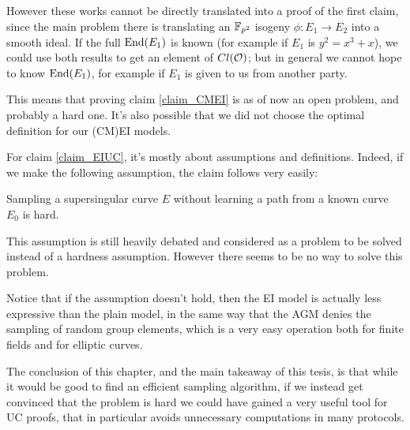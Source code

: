 However these works cannot be directly translated into a proof of the first claim, since the main problem there is translating an $\mathbb{F}_{p^2}$ isogeny $\phi: E_1\to E_2$ into a smooth ideal. If the full $\operatorname{End}(E_1)$ is known (for example if $E_1$ is $y^2=x^3+x$), we could use both results to get an element of $Cl(\mathcal{O})$; but in general we cannot hope to know $\operatorname{End}(E_1)$, for example if $E_1$ is given to us from another party.

This means that proving claim \ref{claim_CMEI} is as of now an open problem, and probably a hard one. It's also possible that we did not choose the optimal definition for our (CM)EI models.

For claim \ref{claim_EIUC}, it's mostly about assumptions and definitions. Indeed, if we make the following assumption, the claim follows very easily:
\begin{assumption}
    Sampling a supersingular curve $E$ without learning a path from a known curve $E_0$ is hard.
\end{assumption}
This assumption is still heavily debated and considered as a problem to be solved instead of a hardness assumption. However there seems to be no way to solve this problem.

Notice that if the assumption doesn't hold, then the EI model is actually less expressive than the plain model, in the same way that the AGM denies the sampling of random group elements, which is a very easy operation both for finite fields and for elliptic curves.

The conclusion of this chapter, and the main takeaway of this tesis, is that while it would be good to find an efficient sampling algorithm, if we instead get convinced that the problem is hard we could have gained a very useful tool for UC proofs, that in particular avoids unnecessary computations in many protocols.



